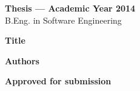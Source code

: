 \thispagestyle{empty}

\begin{flushleft}
\Large{\textbf{Thesis --- Academic Year 2014}} \\
B.Eng. in Software Engineering \kmitl

\vspace{2cm}

\Large{\textbf{Title}} \\
\dms

\vspace{1cm}

\Large{\textbf{Authors}} \\

\end{flushleft}

\vfill
\begin{flushright}
\textbf{Approved for submission}
\vspace{1cm}
\vspace{1cm}
 \\
\vspace{1cm}
 \\
\end{flushright}